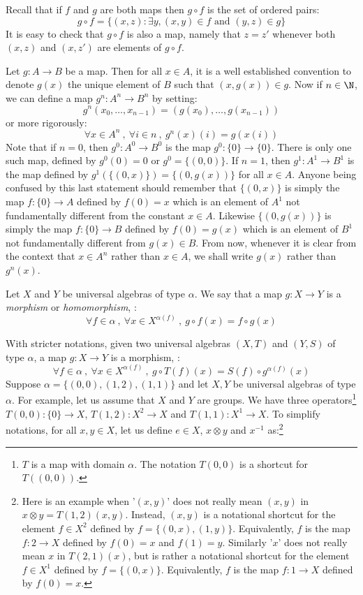 Recall that if $f$ and $g$ are both maps then $g\circ f$ is the set
of ordered pairs:
    \[
    g\circ f=\{(x,z):\exists y, (x,y)\in f\mbox{\ and\ } (y,z)\in g\}
    \]
It is easy to check that $g\circ f$ is also a map, namely that
$z=z'$ whenever both $(x,z)$ and $(x,z')$ are elements of $g\circ
f$.

Let $g:A\to B$ be a map. Then for all $x\in A$, it is a well
established convention to denote $g(x)$ the unique element of $B$
such that $(x,g(x))\in g$. Now if $n\in\N$, we can define a map
$g^{n}:A^{n}\to B^{n}$ by setting:
     \[
     g^{n}(x_{0},\ldots,x_{n-1}) = (g(x_{0}),\ldots,g(x_{n-1}))
     \]
     or more rigorously:
    \[
    \forall x\in A^{n}\ ,\ \forall i\in n\ ,\ g^{n}(x)(i)=g(x(i))
    \]
Note that if $n=0$, then $g^{0}:A^{0}\to B^{0}$ is the map
$g^{0}:\{0\}\to\{0\}$. There is only one such map, defined by
$g^{0}(0)= 0$ or $g^{0}=\{(0,0)\}$. If $n=1$,  then $g^{1}:A^{1}\to
B^{1}$ is the map defined by $g^{1}(\{(0,x)\})=\{(0,g(x))\}$ for all
$x\in A$. Anyone being confused by this last statement should
remember that $\{(0,x)\}$ is simply the map $f:\{0\}\to A$ defined
by $f(0)=x$ which is an element of $A^{1}$ not fundamentally
different from the constant $x\in A$. Likewise $\{(0,g(x))\}$ is
simply the map $f:\{0\}\to B$ defined by $f(0)=g(x)$ which is an
element of $B^{1}$ not fundamentally different from $g(x)\in B$.
From now, whenever it is clear from the context that $x\in A^{n}$
rather than $x\in A$, we shall write $g(x)$ rather than $g^{n}(x)$.
\begin{defin}\label{logic:def:morphism}
Let $X$ and $Y$ be universal algebras of type $\alpha$. We say that
a map $g:X\to Y$ is a {\em morphism} or {\em homomorphism}, \ifand:
    \[
    \forall f\in\alpha\ ,\ \forall x\in X^{\alpha(f)}\ ,\
    g\circ f(x) = f\circ g(x)
    \]
\end{defin}
With stricter notations, given two universal algebras $(X,T)$ and
$(Y,S)$ of type $\alpha$, a map $g:X\to Y$ is a morphism, \ifand:
    \[
     \forall f\in\alpha\ ,\ \forall x\in X^{\alpha(f)}\ ,\
    g\circ T(f)(x) = S(f)\circ g^{\alpha(f)}(x)
    \]
Suppose $\alpha=\{(0,0),(1,2),(1,1)\}$ and let $X,Y$ be universal
algebras of type $\alpha$. For example, let us assume that $X$ and
$Y$ are groups. We have three operators\footnote{$T$ is a map with
domain $\alpha$. The notation $T(0,0)$ is a shortcut for
$T((0,0))$.} $T(0,0):\{0\}\to X$, $T(1,2):X^{2}\to X$ and
$T(1,1):X^{1}\to X$. To simplify notations, for all $x,y\in X$, let
us define $e\in X$, $x\otimes y$ and $x^{-1}$ as:\footnote{ Here is
an example when '$(x,y)$' does not really mean $(x,y)$ in $x\otimes
y=T(1,2)(x,y)$. Instead, $(x,y)$ is a notational shortcut for the
element $f\in X^{2}$ defined by $f=\{(0,x),(1,y)\}$. Equivalently,
$f$ is the map $f:2\to X$ defined by $f(0)=x$ and $f(1)=y$.
Similarly '$x$' does not really mean $x$ in $T(2,1)(x)$, but is
rather a notational shortcut for the element $f\in X^{1}$ defined by
$f=\{(0,x)\}$. Equivalently, $f$ is the map $f:1\to X$ defined by
$f(0)=x$.}
